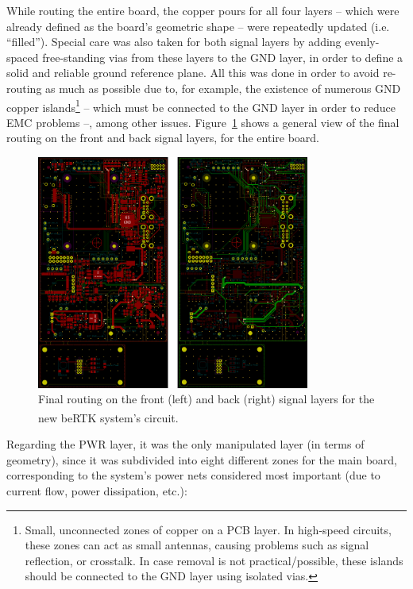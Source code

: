 While routing the entire board, the copper pours for all four layers -- which were already defined as the board's geometric shape -- were repeatedly updated (i.e. ``filled''). Special care was also taken for both signal layers by adding evenly-spaced free-standing vias from these layers to the GND layer, in order to define a solid and reliable ground reference plane. All this was done in order to avoid re-routing as much as possible due to, for example, the existence of numerous GND copper islands\footnote[21]{Small, unconnected zones of copper on a PCB layer. In high-speed circuits, these zones can act as small antennas, causing problems such as signal reflection, or crosstalk. In case removal is not practical/possible, these islands should be connected to the GND layer using isolated vias.} -- which must be connected to the GND layer in order to reduce \gls{EMC} problems --, among other issues. Figure~\ref{fig:7_routing_FULL_FCu_BCu} shows a general view of the final routing on the front and back signal layers, for the entire board.

\begin{figure}[h]
	\centering
	\includegraphics[width=0.8\textwidth]{Chapters/Figures/chapter5/7_routing_FULL_FCu_BCu.png}
	\caption{Final routing on the front (left) and back (right) signal layers for the new beRTK\textsuperscript{\textregistered} system's circuit.}
	\label{fig:7_routing_FULL_FCu_BCu}
\end{figure}

Regarding the PWR layer, it was the only manipulated layer (in terms of geometry), since it was subdivided into eight different zones for the main board, corresponding to the system's power nets considered most important (due to current flow, power dissipation, etc.):

